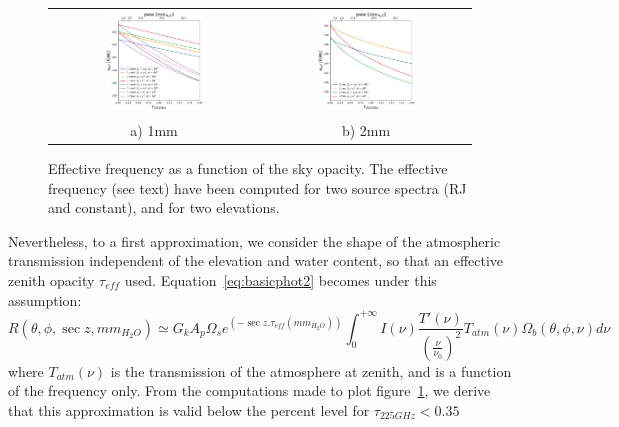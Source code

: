 \begin{figure}[h]
\begin{tabular}{cc}
\includegraphics[width=0.5\textwidth]{Figures/atm_nueff_1mm.pdf}
  & \includegraphics[width=0.5\textwidth]{Figures/atm_nueff_2mm.pdf}
  \\
a) 1mm & b) 2mm \\
\end{tabular}
\caption{Effective frequency as a function of the sky opacity. The
  effective frequency (see text) have been computed for two source
  spectra (RJ and constant), and for two elevations.}
\label{fig:nueff}
\end{figure}

Nevertheless, to a first approximation, we consider the shape of the atmospheric
transmission independent of the elevation and water content, so that  an
effective zenith opacity $\tau_{eff}$
used. 
Equation~\ref{eq:basicphot2} becomes under this assumption: 
\begin{equation}
R(\theta, \phi, \sec z, mm_{H_{2}O}) \simeq G_{k}  A_{p}\Omega_{s} e^{\left(-\sec z
  . \tau_{eff}(mm_{H_{2}O})\right)} \int_{0}^{+\infty} I(\nu)
\frac{T'(\nu)}{\left(\frac{\nu}{\nu_{0}}\right)^{2}} T_{atm}(\nu)
\Omega_{b} (\theta, \phi, \nu) d\nu 
\label{eq:basicphot3}
\end{equation}
where $T_{atm}(\nu)$ is the transmission of the atmosphere at zenith,
and is a function of the frequency only. From the computations made to
plot figure~\ref{fig:nueff}, we derive that this approximation 
is valid below the percent level for $\tau_{225GHz} < 0.35$

